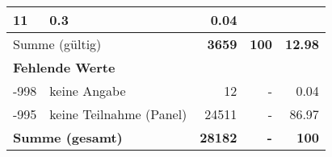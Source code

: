 \begin{longtable}{lXrrr}
       \num{11} &
       \num[round-mode=places,round-precision=2]{0.3} &
         \num[round-mode=places,round-precision=2]{0.04} \\
     \midrule
     \multicolumn{2}{l}{Summe (gültig)} &
       \textbf{\num{3659}} &
     \textbf{100} &
       \textbf{\num[round-mode=places,round-precision=2]{12.98}} \\
     \multicolumn{5}{l}{\textbf{Fehlende Werte}}\\
       -998 &
       keine Angabe &
         \num{12} &
        - &
         \num[round-mode=places,round-precision=2]{0.04} \\
       -995 &
       keine Teilnahme (Panel) &
         \num{24511} &
        - &
         \num[round-mode=places,round-precision=2]{86.97} \\
     \midrule
     \multicolumn{2}{l}{\textbf{Summe (gesamt)}} &
          \textbf{\num{28182}} &
        \textbf{-} &
        \textbf{100} \\
     \bottomrule
     \end{longtable}
     
